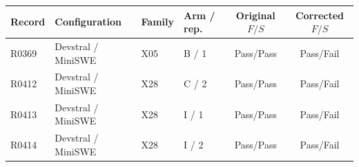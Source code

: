 \begin{tabular}{llllcc}
\toprule
Record & Configuration & Family & Arm / rep. & Original $F/S$ & Corrected $F/S$\\
\midrule
R0369 & Devstral / MiniSWE & X05 & B / 1 & Pass/Pass & Pass/Fail\\
R0412 & Devstral / MiniSWE & X28 & C / 2 & Pass/Pass & Pass/Fail\\
R0413 & Devstral / MiniSWE & X28 & I / 1 & Pass/Pass & Pass/Fail\\
R0414 & Devstral / MiniSWE & X28 & I / 2 & Pass/Pass & Pass/Fail\\
\bottomrule
\end{tabular}
